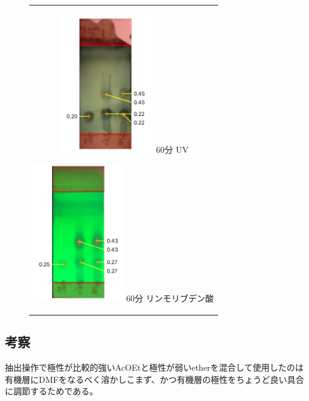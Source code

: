 \documentclass[a4paper,papersize,dvipdfmx]{jsarticle}
\begin{document}
\begin{figure}[H]
\begin{center}
\begin{tabular}{c}
\begin{minipage}{0.20\hsize}
\begin{center}
\includegraphics[clip, height=6cm]{imgs4/tlc3.jpg}
\hspace{1.6cm} \footnotesize{60分 UV}
\end{center}
\end{minipage}

\begin{minipage}{0.05\hsize}
        \hspace{2mm}
      \end{minipage}

\begin{minipage}{0.20\hsize}
\begin{center}
\includegraphics[clip, height=6cm]{imgs4/tlc4.jpg}
\hspace{1.6cm} \footnotesize{60分 リンモリブデン酸}
\end{center}
\end{minipage}

\end{tabular}
\end{center}
\end{figure}

\subsection*{考察}
抽出操作で極性が比較的強いAcOEtと極性が弱いetherを混合して使用したのは有機層にDMFをなるべく溶かしこまず、かつ有機層の極性をちょうど良い具合に調節するためである。
\end{document}
